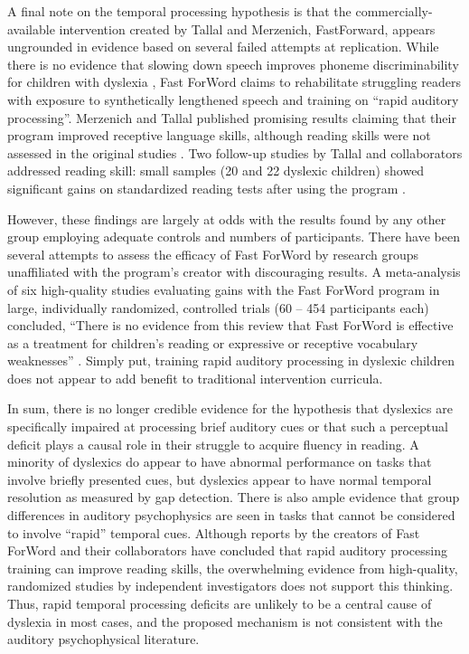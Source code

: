 \documentclass[../uwthesis.tex]{subfiles}
\begin{document}
A final note on the temporal processing hypothesis is that the commercially-available intervention created by Tallal and Merzenich, FastForward, appears ungrounded in evidence based
on several failed attempts at replication. While there is no evidence that slowing down speech improves phoneme discriminability for children with dyslexia \cite{Bradlow1999EffectsChildren}, Fast ForWord claims to
rehabilitate struggling readers with exposure to synthetically lengthened speech and training on “rapid auditory processing”. Merzenich and Tallal published promising results claiming that their program improved receptive language skills, although reading skills were not assessed in the original
studies \cite{Merzenich1996TemporalTraining,Tallal1996LanguageSpeech}. Two follow-up studies by Tallal and collaborators addressed reading skill: small samples (20 and 22 dyslexic children) showed significant gains on
standardized reading tests after using the program \cite{Temple2003NeuralMRI,Gaab2007NeuralStudy}.
 
However, these findings are largely at odds with the results found by any other group
employing adequate controls and numbers of participants. There have been several attempts to
assess the efficacy of Fast ForWord by research groups unaffiliated with the program’s creator with
discouraging results. A meta-analysis of six high-quality studies evaluating gains with the Fast
ForWord program in large, individually randomized, controlled trials (60 – 454 participants each)
concluded, “There is no evidence from this review that Fast ForWord is effective as a treatment for
children’s reading or expressive or receptive vocabulary weaknesses” \cite{Strong2011AProgram}. Simply
put, training rapid auditory processing in dyslexic children does not appear to add benefit to
traditional intervention curricula.
 
In sum, there is no longer credible evidence for the hypothesis that dyslexics are specifically impaired at processing brief auditory cues or that such a perceptual deficit plays a causal role in their struggle to acquire fluency in reading. A minority of dyslexics do appear to have abnormal performance on tasks that involve briefly presented cues, but dyslexics appear to have normal temporal resolution as measured by gap detection. There is also ample evidence that group differences in auditory psychophysics are seen in tasks that cannot be considered to involve “rapid” temporal cues. Although reports by the creators of Fast ForWord and their collaborators have
concluded that rapid auditory processing training can improve reading skills, the overwhelming evidence from high-quality, randomized studies by independent investigators does not support this thinking. Thus, rapid temporal processing deficits are unlikely to be a central cause of dyslexia in most cases, and the proposed mechanism is not consistent with the auditory psychophysical literature.
\end{document}
